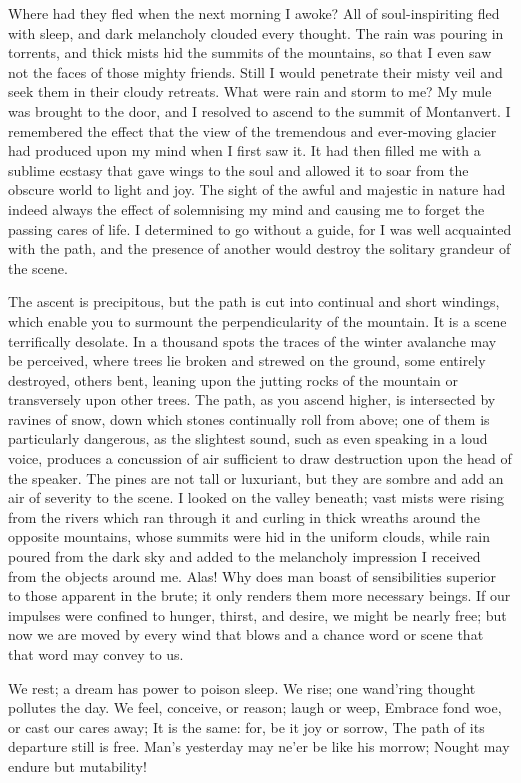 \documentclass[12pt,openright]{book}
\begin{document}
Where had they fled when the next morning I awoke? All of soul-inspiriting fled with sleep, and dark melancholy clouded every thought. The rain was pouring in torrents, and thick mists hid the summits of the mountains, so that I even saw not the faces of those mighty friends. Still I would penetrate their misty veil and seek them in their cloudy retreats. What were rain and storm to me? My mule was brought to the door, and I resolved to ascend to the summit of Montanvert. I remembered the effect that the view of the tremendous and ever-moving glacier had produced upon my mind when I first saw it. It had then filled me with a sublime ecstasy that gave wings to the soul and allowed it to soar from the obscure world to light and joy. The sight of the awful and majestic in nature had indeed always the effect of solemnising my mind and causing me to forget the passing cares of life. I determined to go without a guide, for I was well acquainted with the path, and the presence of another would destroy the solitary grandeur of the scene.

The ascent is precipitous, but the path is cut into continual and short windings, which enable you to surmount the perpendicularity of the mountain. It is a scene terrifically desolate. In a thousand spots the traces of the winter avalanche may be perceived, where trees lie broken and strewed on the ground, some entirely destroyed, others bent, leaning upon the jutting rocks of the mountain or transversely upon other trees. The path, as you ascend higher, is intersected by ravines of snow, down which stones continually roll from above; one of them is particularly dangerous, as the slightest sound, such as even speaking in a loud voice, produces a concussion of air sufficient to draw destruction upon the head of the speaker. The pines are not tall or luxuriant, but they are sombre and add an air of severity to the scene. I looked on the valley beneath; vast mists were rising from the rivers which ran through it and curling in thick wreaths around the opposite mountains, whose summits were hid in the uniform clouds, while rain poured from the dark sky and added to the melancholy impression I received from the objects around me. Alas! Why does man boast of sensibilities superior to those apparent in the brute; it only renders them more necessary beings. If our impulses were confined to hunger, thirst, and desire, we might be nearly free; but now we are moved by every wind that blows and a chance word or scene that that word may convey to us.

We rest; a dream has power to poison sleep. We rise; one wand’ring thought pollutes the day. We feel, conceive, or reason; laugh or weep, Embrace fond woe, or cast our cares away; It is the same: for, be it joy or sorrow, The path of its departure still is free. Man’s yesterday may ne’er be like his morrow; Nought may endure but mutability!
\end{document}

